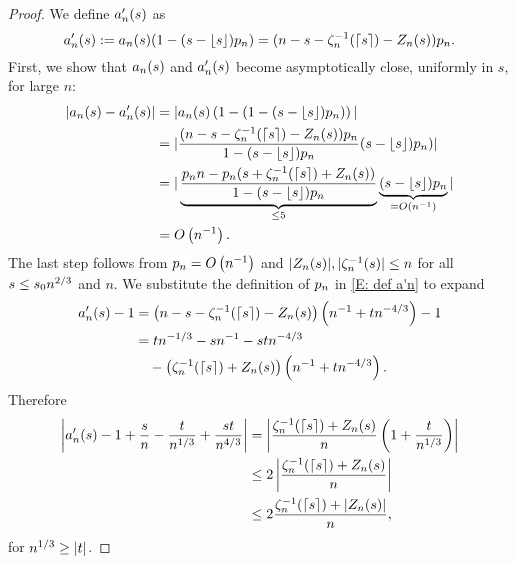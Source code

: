 \begin{proof} \label{P: limit An}
	We define $a'_n(s)$ as
	\begin{equation} \label{E: def a'n}
		a'_n(s) := a_n(s) (1 - (s - \lfloor s\rfloor)p_n) = (n - s - \zeta^{-1}_n(\lceil s\rceil) - Z_n(s)) p_n.
	\end{equation}
	First, we show that $a_n(s)$ and $a'_n(s)$ become asymptotically close, uniformly in $s$, for large $n$:
	\begin{equation} \label{E: convergence an amn}
	\begin{aligned}
	|a_n(s) - a'_n(s)|
	&= |a_n(s)\left( 1-(1 - (s - \lfloor s\rfloor)p_n) \right)| \\
	&= | \frac{(n - s - \zeta^{-1}_n(\lceil s\rceil) - Z_n(s))p_n}{1-(s - \lfloor s\rfloor)p_n} (s - \lfloor s\rfloor)p_n) | \\
	&= |\underbrace{\frac{p_n n - p_n(s + \zeta^{-1}_n(\lceil s\rceil) + Z_n(s))}{1-(s - \lfloor s\rfloor)p_n}}_{\leq 5} 
		\underbrace{(s - \lfloor s\rfloor)p_n}_{=O\left(n^{-1}\right)} |\\
	&= O\left(n^{-1}\right).
	\end{aligned}
	\end{equation}
	The last step follows from $p_n = O\left(n^{-1}\right)$ and $|Z_n(s)|, |\zeta^{-1}_n(s)| \leq n$ for all $s \leq s_0n^{2 / 3}$ and $n$.
	We substitute the definition of $p_n$ in \eqref{E: def a'n} to expand
	\begin{align*}
	a'_n(s) - 1 
	&= \left( n - s - \zeta^{-1}_n(\lceil s\rceil) - Z_n(s) \right) \left( n^{-1} + tn^{-4 / 3} \right) - 1 \\
	&= tn^{-1 / 3} - sn^{-1} - stn^{-4 / 3} \\
	&\quad - \left( \zeta^{-1}_n(\lceil s\rceil) + Z_n(s) \right) \left( n^{-1} + tn^{-4 / 3} \right).
	\end{align*}
	Therefore
	\begin{equation} \label{E: an zeta Z / n} 
	\begin{aligned}
	\left| a'_n(s) - 1 + \frac{s}{n} - \frac{t}{n^{1 / 3}} + \frac{st}{n^{4 / 3}} \right|
	&= \left| \frac{\zeta^{-1}_n(\lceil s\rceil) + Z_n(s)}{n} \left( 1 + \frac{t}{n^{1 / 3}} \right) \right| \\
	&\leq 2 \left| \frac{\zeta^{-1}_n(\lceil s\rceil) + Z_n(s)}{n} \right| \\
	&\leq 2 \frac{\zeta^{-1}_n(\lceil s\rceil) + |Z_n(s)|}{n} ,  
	\end{aligned}
	\end{equation}
	for $n^{1 / 3} \geq |t|$.

\end{proof}
